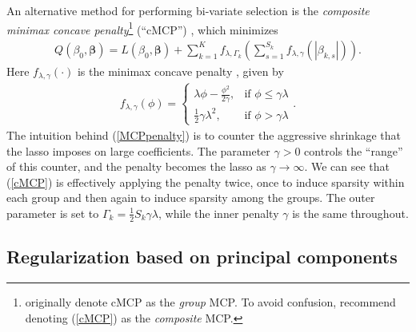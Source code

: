 \documentclass[11pt]{article}
\newcommand{\citeay}[1]{\citeauthor{#1} \citeyear{#1}}
\begin{document}
An alternative method for performing bi-variate selection is the \textit{composite minimax concave penalty}\footnote{\citeay{breheny2009penalized} originally denote cMCP as the \textit{group} MCP. To avoid confusion, \citeay{huang2012selective} recommend denoting (\ref{cMCP}) as the \textit{composite} MCP.} (``cMCP'') \cite{breheny2009penalized}, which minimizes
\begin{align}
    \label{cMCP}
    Q(\beta_0, \bm{\beta}) = L(\beta_0, \bm{\beta}) + \sum_{k=1}^K f_{\lambda, \Gamma_k} \left( \sum_{s=1}^{S_k} f_{\lambda, \gamma}(|\beta_{k,s}|) \right).
\end{align}
Here $f_{\lambda, \gamma}(\cdot)$ is the minimax concave penalty \cite{zhang2007penalized}, given by 
\begin{align}
    \label{MCPpenalty}
    f_{\lambda, \gamma}(\phi) = \begin{cases}
        \lambda \phi - \frac{\phi^2}{2 \gamma}, & \text{if } \phi \le \gamma \lambda \\
        \frac{1}{2} \gamma \lambda^2, & \text{if } \phi > \gamma \lambda
    \end{cases}.
\end{align}
The intuition behind (\ref{MCPpenalty}) is to counter the aggressive shrinkage that the lasso imposes on large coefficients. The parameter $\gamma > 0$ controls the ``range'' of this counter, and the penalty becomes the lasso as $\gamma \to \infty$. We can see that (\ref{cMCP}) is effectively applying the penalty twice, once to induce sparsity within each group and then again to induce sparsity among the groups. The outer parameter is set to $\Gamma_k = \frac{1}{2} S_k \gamma \lambda$, while the inner penalty $\gamma$ is the same throughout. 




\subsection{Regularization based on principal components}
\end{document}
